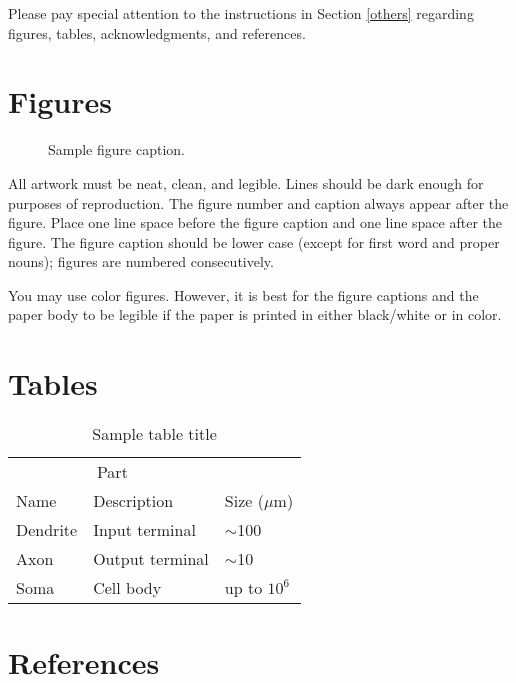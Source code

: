 \documentclass{article}
\begin{document}
Please pay special attention to the instructions in Section \ref{others}
regarding figures, tables, acknowledgments, and references.

\section{Figures}

\begin{figure}[h]
  \centering
  \fbox{\rule[-.5cm]{0cm}{4cm} \rule[-.5cm]{4cm}{0cm}}
  \caption{Sample figure caption.}
\end{figure}

All artwork must be neat, clean, and legible. Lines should be dark enough for
purposes of reproduction. The figure number and caption always appear after the
figure. Place one line space before the figure caption and one line space after
the figure. The figure caption should be lower case (except for first word and
proper nouns); figures are numbered consecutively.

You may use color figures.  However, it is best for the figure captions and the
paper body to be legible if the paper is printed in either black/white or in
color.

\section{Tables}

\begin{table}[h]
  \caption{Sample table title}
  \label{sample-table}
  \centering
  \begin{tabular}{lll}
    \toprule
    \multicolumn{2}{c}{Part}                   \\
    \cmidrule(r){1-2}
    Name     & Description     & Size ($\mu$m) \\
    \midrule
    Dendrite & Input terminal  & $\sim$100     \\
    Axon     & Output terminal & $\sim$10      \\
    Soma     & Cell body       & up to $10^6$  \\
    \bottomrule
  \end{tabular}
\end{table}

\section*{References}

\medskip
\end{document}
